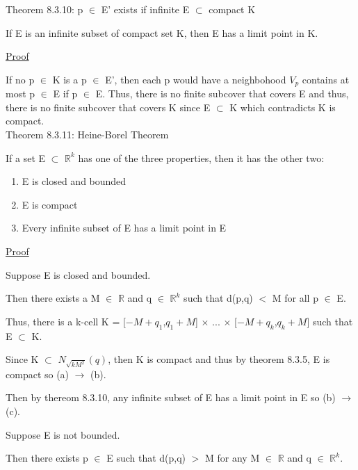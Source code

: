 { \color{red} Theorem 8.3.10: p $\in$ E' exists if
infinite E $\subset$ compact K }

	\begin{adjustbox}{minipage=14cm, right, vspace=0.1cm 0cm}
		If E is an infinite subset of compact set K, then E has a
		limit point in K.
	\end{adjustbox}

{ \color{magenta} \underline{Proof} } 

	If no p $\in$ K is a p $\in$ E', then each p would have
	a neighbohood $V_p$ contains at most p $\in$ E if p $\in$ E.
	Thus, there is no finite subcover that covers E and thus,
	there is no finite subcover that covers K since E $\subset$ K
	which contradicts K is compact. \\

{ \color{red} Theorem 8.3.11: Heine-Borel Theorem } 

	\begin{adjustbox}{minipage=14cm, right, vspace=0.1cm 0cm}
		If a set E $\subset$ $\mathbb{R}^k$ has one of the three properties,
		then it has the other two:
	\end{adjustbox}

	\begin{enumerate}[label=(\alph*), leftmargin=2cm, itemsep=0.1cm]
		\item E is closed and bounded
		\item E is compact
		\item Every infinite subset of E has a limit point in E
	\end{enumerate}

{ \color{magenta} \underline{Proof} } 

	Suppose E is closed and bounded.

	Then there exists a M $\in$ $\mathbb{R}$ and q $\in$ $\mathbb{R}^k$
	such that d(p,q) $<$ M for all p $\in$ E.
	
	Thus, there is a k-cell
	K = [$-M+q_1$,$q_1+M$] $\times$ ... $\times$ [$-M+q_k$,$q_k+M$]
	such that E $\subset$ K.

	Since K $\subset$ $N_{\sqrt{kM^2}}(q)$, then K is compact
	and thus by {\color{red} theorem 8.3.5}, E is compact
	so (a) $\rightarrow$ (b).

	Then by {\color{red} thereom 8.3.10}, any infinite subset
	of E has a limit point in E so (b) $\rightarrow$ (c).

	Suppose E is not bounded.

	Then there exists p $\in$ E such that d(p,q) $>$ M for
	any M $\in$ $\mathbb{R}$ and q $\in$ $\mathbb{R}^k$.

